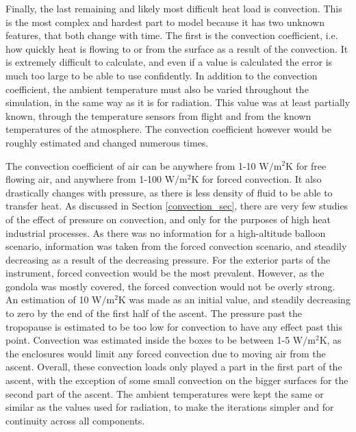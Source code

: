 Finally, the last remaining and likely most difficult heat load is convection. This is the most complex and hardest part to model because it has two unknown features, that both change with time. The first is the convection coefficient, i.e. how quickly heat is flowing to or from the surface as a result of the convection. It is extremely difficult to calculate, and even if a value is calculated the error is much too large to be able to use confidently. In addition to the convection coefficient, the ambient temperature must also be varied throughout the simulation, in the same way as it is for radiation. This value was at least partially known, through the temperature sensors from flight and from the known temperatures of the atmosphere. The convection coefficient however would be roughly estimated and changed numerous times.

The convection coefficient of air can be anywhere from 1-10 $\mathrm{W/m^2K}$ for free flowing air, and anywhere from 1-100 $\mathrm{W/m^2K}$ for forced convection. It also drastically changes with pressure, as there is less density of fluid to be able to transfer heat. As discussed in Section \ref{convection_sec}, there are very few studies of the effect of pressure on convection, and only for the purposes of high heat industrial processes. As there was no information for a high-altitude balloon scenario, information was taken from the forced convection scenario, and steadily decreasing as a result of the decreasing pressure. For the exterior parts of the instrument, forced convection would be the most prevalent. However, as the gondola was mostly covered, the forced convection would not be overly strong. An estimation of 10 $\mathrm{W/m^2K}$ was made as an initial value, and steadily decreasing to zero by the end of the first half of the ascent. The pressure past the tropopause is estimated to be too low for convection to have any effect past this point. Convection was estimated inside the boxes to be between 1-5 $\mathrm{W/m^2K}$, as the enclosures would limit any forced convection due to moving air from the ascent. Overall, these convection loads only played a part in the first part of the ascent, with the exception of some small convection on the bigger surfaces for the second part of the ascent. The ambient temperatures were kept the same or similar as the values used for radiation, to make the iterations simpler and for continuity across all components.

